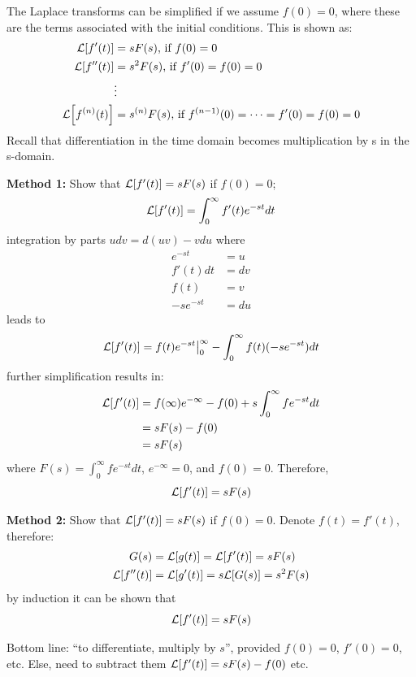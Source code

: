 \documentclass[12pt,letter]{article}
\begin{document}
The Laplace transforms can be simplified if we assume $ f(0) = 0$, where these are the terms associated with the initial conditions. This is shown as:
\begin{align}
\mathcal{L}{\left[f'(t)\right]} &= sF(s) \text{, if } f(0) = 0   \\
\mathcal{L}{\left[f''(t)\right]} &= s^2F(s) \text{, if } f'(0) = f(0) = 0  \nonumber \\
&\vdots  \nonumber \\
\mathcal{L}{\left[f^{(n)}(t)\right]} &= s^{(n)}F(s) \text{, if } f^{(n-1)}(0) = \cdots = f'(0) = f(0) = 0 \nonumber  
\end{align}
Recall that differentiation in the time domain becomes multiplication by s in the s-domain.


\begin{bookproof}
\noindent \textbf{Method 1:}
Show that $\mathcal{L}{\left[f'(t)\right]} = s F(s)$ if $f(0) = 0$;
\begin{equation}
\mathcal{L}{\left[f'(t)\right]} = \int_{0}^{\infty} f'(t)e^{-st}dt 
\end{equation}
integration by parts $udv = d(uv) -vdu$ where
\begin{align}
e^{-st} &= u   \\
f'(t)dt &= dv  \nonumber \\
f(t) &= v  \nonumber \\
-se^{-st} &= du   \nonumber
\end{align}
leads to
\begin{equation}
\mathcal{L}{\left[f'(t)\right]} = f(t)e^{-st}\big|_{0}^{\infty} - \int_{0}^{\infty}f(t)(-se^{-st})dt
\end{equation}
further simplification results in:
\begin{align}
\mathcal{L}{\left[f'(t)\right]} &= f(\infty)e^{- \infty} - f(0) + s \int_{0}^{\infty} f e^{-s t} dt   \\
 &= s F(s) -f(0)  \nonumber \\
 &= s F(s)  \nonumber
\end{align}
where $F(s) = \int_{0}^{\infty} f e^{-s t} dt$, $e^{- \infty}=0$, and $f(0) = 0$. Therefore, 
\begin{equation}
\mathcal{L}{\left[f'(t)\right]} = s F(s)
\end{equation}

\noindent \textbf{Method 2:}
Show that $\mathcal{L}{\left[f'(t)\right]} = s F(s)$ if $f(0) = 0$. Denote $f(t) = f'(t)$, therefore:
\begin{align}
G(s) &= \mathcal{L}{\left[g(t)\right]} = \mathcal{L}{\left[f'(t)\right]} = sF(s)  \\
\mathcal{L}{\left[f''(t)\right]} &= \mathcal{L}{\left[g'(t)\right]} = s\mathcal{L}{\left[G(s)\right]} = s^2F(s)  \nonumber
\end{align}
by induction it can be shown that 
\begin{equation}
\mathcal{L}{\left[f'(t)\right]} = s F(s)
\end{equation}

Bottom line: ``to differentiate, multiply by $s$'', provided $f(0) =0$, $f'(0) =0$, etc. Else, need to subtract them $\mathcal{L}{\left[f'(t)\right]} = sF(s) -f(0)$ etc. 
\end{bookproof}
\end{document}
